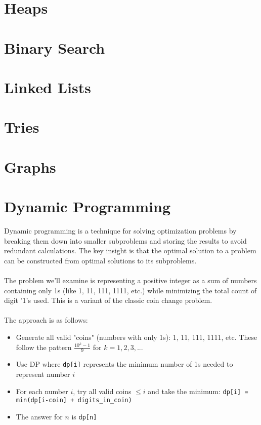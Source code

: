 \section{Heaps}

\section{Binary Search}


\section{Linked Lists}

\section{Tries}

\section{Graphs}

\section{Dynamic Programming}
Dynamic programming is a technique for solving optimization problems by breaking them down into smaller subproblems and storing
the results to avoid redundant calculations. The key insight is that the optimal solution to a problem can be constructed from 
optimal solutions to its subproblems.\\
\\
The problem we'll examine is representing a positive integer as a sum of numbers containing only 1s (like 1, 11, 111, 1111, etc.)
while minimizing the total count of digit '1's used. This is a variant of the classic coin change problem.\\
\\
The approach is as follows:
\begin{itemize}
    \item Generate all valid "coins" (numbers with only 1s): 1, 11, 111, 1111, etc. These follow the pattern $\frac{10^k - 1}{9}$ for $k = 1, 2, 3, ...$
    \item Use DP where \texttt{dp[i]} represents the minimum number of 1s needed to represent number $i$
    \item For each number $i$, try all valid coins $\leq i$ and take the minimum: \texttt{dp[i] = min(dp[i-coin] + digits\_in\_coin)}
    \item The answer for $n$ is \texttt{dp[n]}
\end{itemize}

